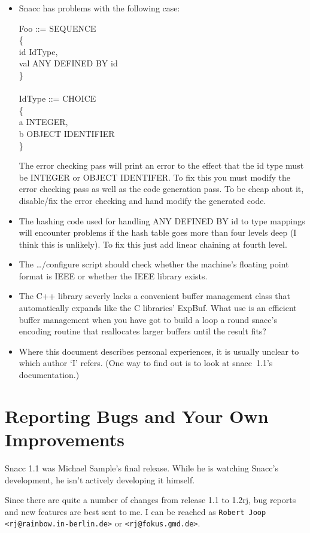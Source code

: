 \begin{itemize}
  \item
    Snacc has problems with the following case:
    \begin{ASNcode}
      Foo ::= SEQUENCE\\
      \{\+\\
	id IdType,\\
	val ANY DEFINED BY id\-\\
      \}\\
      \\
      IdType ::= CHOICE\\
      \{\+\\
	a INTEGER,\\
	b OBJECT IDENTIFIER\-\\
      \}
    \end{ASNcode}

    The error checking pass will print an error to the effect that the id
    type must be INTEGER or OBJECT IDENTIFER\@.  To fix this you must modify
    the error checking pass as well as the code generation pass.  To be
    cheap about it, disable/fix the error checking and hand modify the
    generated code.

  \item
    The hashing code used for handling ANY DEFINED BY id to type mappings
    will encounter problems if the hash table goes more than four levels
    deep (I think this is unlikely).  To fix this just add linear chaining
    at fourth level.

  \item 
    The {\ufn \dots/configure} script should check whether the machine's floating point format is IEEE or whether the IEEE library exists.

  \item
    The C++ library severly lacks a convenient buffer management class that automatically expands like the C libraries' ExpBuf.
    What use is an efficient buffer management when you have got to build a loop a round snacc's encoding routine that reallocates larger buffers until the result fits?

  \item
    Where this document describes personal experiences, it is usually unclear to which author `I' refers.
    (One way to find out is to look at snacc~1.1's documentation.)

\end{itemize}

\section{\label{bug-section}Reporting Bugs and Your Own Improvements}

Snacc 1.1 was Michael Sample's final release.
While he is watching Snacc's development, he isn't actively developing it himself.

Since there are quite a number of changes from release 1.1 to 1.2rj, bug reports and new features are best sent to me.
I can be reached as \texttt{Robert Joop <rj@rainbow.in-berlin.de>} or \texttt{<rj@fokus.gmd.de>}.
